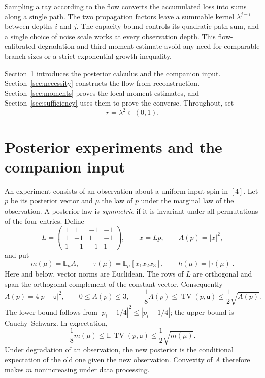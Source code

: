 \documentclass[11pt]{article}
\numberwithin{equation}{section}
\newcommand{\E}{\mathbb E}
\newcommand{\unif}{\mathsf u}
\newcommand{\TV}{\operatorname{TV}}
\begin{document}
Sampling a ray according to the flow converts the accumulated
loss into sums along a single path. The two propagation factors
leave a summable kernel $\lambda^{j-i}$ between depths $i$ and
$j$. The capacity bound controls its quadratic path sum, and a
single choice of noise scale works at every observation depth.
This flow-calibrated degradation and third-moment estimate avoid
any need for comparable branch sizes or a strict exponential
growth inequality.

Section~\ref{sec:posteriors} introduces the posterior calculus
and the companion input. Section~\ref{sec:necessity} constructs
the flow from reconstruction. Section~\ref{sec:moments} proves
the local moment estimates, and Section~\ref{sec:sufficiency}
uses them to prove the converse. Throughout, set
\[
 r=\lambda^2\in(0,1).
\]

\section{Posterior experiments and the companion input}
\label{sec:posteriors}

An experiment consists of an observation about a uniform input
spin in $[4]$. Let $p$ be its posterior vector and $\mu$ the law
of $p$ under the marginal law of the observation. A posterior law
is \emph{symmetric} if it is invariant under all permutations of
the four entries. Define
\[
 L=\begin{pmatrix}
 1&1&-1&-1\\
 1&-1&1&-1\\
 1&-1&-1&1
 \end{pmatrix},\qquad x=Lp,\qquad A(p)=|x|^2,
\]
and put
\begin{equation}\label{eq:statistics}
 m(\mu)=\E_\mu A,
 \qquad \tau(\mu)=\E_\mu[x_1x_2x_3],
 \qquad h(\mu)=|\tau(\mu)|.
\end{equation}
Here and below, vector norms are Euclidean. The rows of $L$ are
orthogonal and span the orthogonal complement of the constant
vector. Consequently
\begin{equation}\label{eq:posterior-bounds}
 A(p)=4|p-\unif|^2,\qquad 0\leq A(p)\leq3,
 \qquad \frac18A(p)\leq\TV(p,\unif)\leq\frac12\sqrt{A(p)}.
\end{equation}
The lower bound follows from $|p_i-1/4|^2\leq|p_i-1/4|$;
the upper bound is Cauchy--Schwarz. In expectation,
\begin{equation}\label{eq:expected-TV}
 \frac18m(\mu)\leq\E\,\TV(p,\unif)
       \leq\frac12\sqrt{m(\mu)}.
\end{equation}
Under degradation of an observation, the new posterior is the
conditional expectation of the old one given the new observation.
Convexity of $A$ therefore makes $m$ nonincreasing under data
processing.
\end{document}
